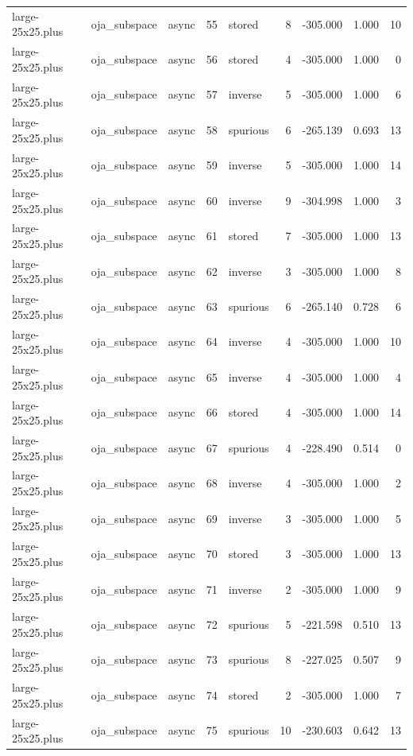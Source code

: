 \begin{tabular}{lllrlrrrr}
large-25x25.plus & oja\_subspace & async & 55 & stored & 8 & -305.000 & 1.000 & 10 \\
large-25x25.plus & oja\_subspace & async & 56 & stored & 4 & -305.000 & 1.000 & 0 \\
large-25x25.plus & oja\_subspace & async & 57 & inverse & 5 & -305.000 & 1.000 & 6 \\
large-25x25.plus & oja\_subspace & async & 58 & spurious & 6 & -265.139 & 0.693 & 13 \\
large-25x25.plus & oja\_subspace & async & 59 & inverse & 5 & -305.000 & 1.000 & 14 \\
large-25x25.plus & oja\_subspace & async & 60 & inverse & 9 & -304.998 & 1.000 & 3 \\
large-25x25.plus & oja\_subspace & async & 61 & stored & 7 & -305.000 & 1.000 & 13 \\
large-25x25.plus & oja\_subspace & async & 62 & inverse & 3 & -305.000 & 1.000 & 8 \\
large-25x25.plus & oja\_subspace & async & 63 & spurious & 6 & -265.140 & 0.728 & 6 \\
large-25x25.plus & oja\_subspace & async & 64 & inverse & 4 & -305.000 & 1.000 & 10 \\
large-25x25.plus & oja\_subspace & async & 65 & inverse & 4 & -305.000 & 1.000 & 4 \\
large-25x25.plus & oja\_subspace & async & 66 & stored & 4 & -305.000 & 1.000 & 14 \\
large-25x25.plus & oja\_subspace & async & 67 & spurious & 4 & -228.490 & 0.514 & 0 \\
large-25x25.plus & oja\_subspace & async & 68 & inverse & 4 & -305.000 & 1.000 & 2 \\
large-25x25.plus & oja\_subspace & async & 69 & inverse & 3 & -305.000 & 1.000 & 5 \\
large-25x25.plus & oja\_subspace & async & 70 & stored & 3 & -305.000 & 1.000 & 13 \\
large-25x25.plus & oja\_subspace & async & 71 & inverse & 2 & -305.000 & 1.000 & 9 \\
large-25x25.plus & oja\_subspace & async & 72 & spurious & 5 & -221.598 & 0.510 & 13 \\
large-25x25.plus & oja\_subspace & async & 73 & spurious & 8 & -227.025 & 0.507 & 9 \\
large-25x25.plus & oja\_subspace & async & 74 & stored & 2 & -305.000 & 1.000 & 7 \\
large-25x25.plus & oja\_subspace & async & 75 & spurious & 10 & -230.603 & 0.642 & 13 \\

\end{tabular}
